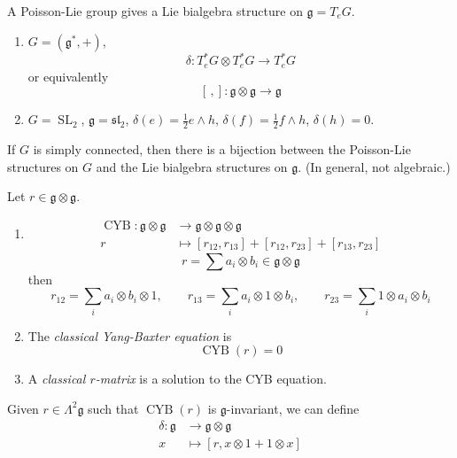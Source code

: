 \begin{proposition}
\label{proposition-l2-lie-bialgebra}
A Poisson-Lie group gives a Lie bialgebra
structure on $\mathfrak{g}=T_{e}G$.
\end{proposition}

\begin{example}
\label{example-l2-lie-bialgebras}
\begin{enumerate}
\item $G=(\mathfrak{g}^{*},+)$,
$$
\delta:T_{e}^{*} G\otimes T_{e}^{*} G
\to T^{*}_{e}G
$$
or equivalently
$$
[\,,]:\mathfrak{g}\otimes \mathfrak{g}
\to \mathfrak{g}
$$
\item $G=\operatorname{SL}_{2}$,
$\mathfrak{g}=\mathfrak{sl}_{2}$,
$\delta(e)=\frac{1}{2} e\wedge h$,
$\delta(f)=\frac{1}{2} f\wedge h$,
$\delta(h)=0$.
\end{enumerate}
\end{example}

\begin{theorem}[Drinfeld]
\label{theorem-l2-drinfeld}
If $G$ is simply connected, then there is
a bijection between the Poisson-Lie
structures on $G$ and the Lie bialgebra
structures on $\mathfrak{g}$.
(In general, not algebraic.)
\end{theorem}

Let $r\in \mathfrak{g}\otimes \mathfrak{g}$.

\begin{definition}
\label{definition-l2-cyb}
\begin{enumerate}
\item
$$
\begin{aligned}
\operatorname{CYB}:
\mathfrak{g}\otimes \mathfrak{g}&\to
\mathfrak{g}\otimes \mathfrak{g}\otimes
\mathfrak{g}\\
r&\longmapsto [r_{12},r_{13}]+
[r_{12},r_{23}]+[r_{13},r_{23}]
\end{aligned}
$$
$$
r=\sum a_{i}\otimes b_{i}\in
\mathfrak{g}\otimes \mathfrak{g}
$$
then
$$
r_{12}=\sum_{i}a_{i}\otimes b_{i}
\otimes 1,\qquad
r_{13}=\sum_{i}a_{i}\otimes 1\otimes
b_{i},\qquad
r_{23}=\sum_{i}1\otimes a_{i}\otimes
b_{i}
$$
\item The {\it classical Yang-Baxter
equation} is
$$
\operatorname{CYB}(r)=0
$$
\item A {\it classical $r$-matrix} is a
solution to the CYB equation.
\end{enumerate}
\end{definition}

Given $r\in \Lambda^{2} \mathfrak{g}$ such
that $\operatorname{CYB}(r)$ is
$\mathfrak{g}$-invariant, we can define
$$
\begin{aligned}
\delta: \mathfrak{g} &\longrightarrow
\mathfrak{g}\otimes \mathfrak{g} \\
x &\longmapsto
[r,x\otimes 1+1\otimes x]
\end{aligned}
$$


